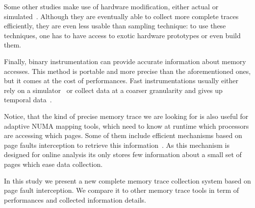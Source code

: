 Some other studies make use of hardware modification, either actual or
simulated~\cite{Bao08HMTT,Martonosi92MemSpy}.  Although they are eventually able to collect
more complete traces efficiently, they are even less usable than sampling technique: to use
these techniques, one has to have access to exotic hardware prototypes or even build them.

Finally, binary instrumentation can provide accurate information about memory accesses.
This method is portable and  more precise than the aforementioned ones,
but it comes at the cost of performances. Fast
instrumentations usually either rely on a simulator~\cite{DeRose02SIGMA}
  or
collect data at a coarser granularity and gives up temporal data~\cite{Beniamine15TABARNACRR}.

Notice, that the kind of precise memory trace we are looking for is also useful for adaptive NUMA mapping tools, which
need to know at runtime which processors are accessing which pages. Some of
them include efficient mechanisms based on page faults interception to
retrieve this information~\cite{Diener13CommunicationBased}. As this
mechanism is designed for online analysis its only stores few information about
a small set of pages which ease data collection.

In this study we present a new complete memory trace collection system based on page
fault interception. We compare it to other memory trace tools in term of
performances and collected information details.

